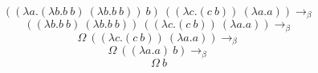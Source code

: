 ﻿\documentclass{report}
\begin{document}
\[((\lambda a.(\lambda b.b\ b)\ (\lambda b.b\ b))\ b)\ ((\lambda c.(c\ b))\ (\lambda a.a)) \rightarrow_\beta\]
\[((\lambda b.b\ b)\ (\lambda b.b\ b))\ ((\lambda c.(c\ b))\ (\lambda a.a)) \rightarrow_\beta\]
\[\Omega\ ((\lambda c.(c\ b))\ (\lambda a.a)) \rightarrow_\beta\]
\[\Omega\ ((\lambda a.a)\ b) \rightarrow_\beta\]
\[\Omega\ b\]
\end{document}
